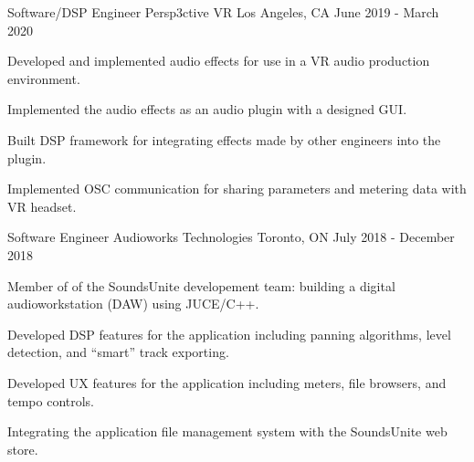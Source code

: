 \begin{cventries}
  \cventry
    {Software/DSP Engineer} %
    {Persp3ctive VR} %
    {Los Angeles, CA} %
    {June 2019 - March 2020} %
    {
      \begin{cvitems} %
        \item {Developed and implemented audio effects for use in a VR audio production environment.}
        \item {Implemented the audio effects as an audio plugin with a designed GUI.}
        \item {Built DSP framework for integrating effects made by other engineers into the plugin.}
        \item {Implemented OSC communication for sharing parameters and metering data with VR headset.}
      \end{cvitems}
    }

  \cventry
    {Software Engineer} %
    {Audioworks Technologies} %
    {Toronto, ON} %
    {July 2018 - December 2018} %
    {
      \begin{cvitems} %
        \item {Member of of the SoundsUnite developement team: building a digital audioworkstation (DAW) using JUCE/C++.}
        \item {Developed DSP features for the application including panning algorithms, level detection, and ``smart'' track exporting.}
        \item {Developed UX features for the application including meters, file browsers, and tempo controls.}
        \item {Integrating the application file management system with the SoundsUnite web store.}
      \end{cvitems}
    }


\end{cventries}
